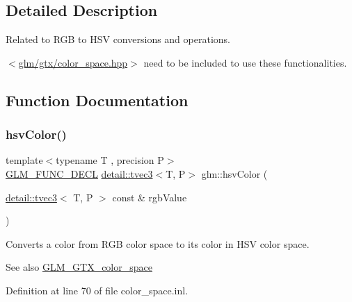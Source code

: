 \subsection{Detailed Description}
Related to R\+GB to H\+SV conversions and operations. 

$<$\hyperlink{color__space_8hpp}{glm/gtx/color\+\_\+space.\+hpp}$>$ need to be included to use these functionalities. 

\subsection{Function Documentation}
\mbox{\label{group__gtx__color__space_ga9d3d99c06af10403d317dec0cb655090}} 
\subsubsection{\texorpdfstring{hsv\+Color()}{hsvColor()}}
{\footnotesize\ttfamily template$<$typename T , precision P$>$ \\
\hyperlink{setup_8hpp_ab2d052de21a70539923e9bcbf6e83a51}{G\+L\+M\+\_\+\+F\+U\+N\+C\+\_\+\+D\+E\+CL} \hyperlink{structglm_1_1detail_1_1tvec3}{detail\+::tvec3}$<$T, P$>$ glm\+::hsv\+Color (\begin{DoxyParamCaption}\item[{\hyperlink{structglm_1_1detail_1_1tvec3}{detail\+::tvec3}$<$ T, P $>$ const \&}]{rgb\+Value }\end{DoxyParamCaption})}

Converts a color from R\+GB color space to its color in H\+SV color space. \begin{DoxySeeAlso}{See also}
\hyperlink{group__gtx__color__space}{G\+L\+M\+\_\+\+G\+T\+X\+\_\+color\+\_\+space} 
\end{DoxySeeAlso}


Definition at line 70 of file color\+\_\+space.\+inl.

\mbox{\label{group__gtx__color__space_ga3fb6710bbbf4f3e2303b06946e9cf00c}} 
